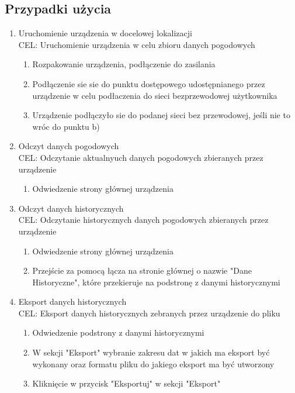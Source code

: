 \documentclass[12pt,a4paper]{article}
\begin{document}
\subsection{Przypadki użycia}

\begin{enumerate}
    \item Uruchomienie urządzenia w docelowej lokalizacji\\
    CEL: Uruchomienie urządzenia w celu zbioru danych pogodowych
    \begin{enumerate}
        \item Rozpakowanie urządzenia, podłączenie do zasilania
        \item Podłączenie sie sie do punktu dostępowego udostępnianego przez urządzenie w celu podłaczenia do sieci bezprzewodowej użytkownika
        \item Urządzenie podłączyło sie do podanej sieci bez przewodowej, jeśli nie to wróc do punktu b)
    \end{enumerate}
    \item Odczyt danych pogodowych\\
    CEL: Odczytanie aktualnyuch danych pogodowych zbieranych przez urządzenie
    \begin{enumerate}
        \item Odwiedzenie strony głównej urządzenia
    \end{enumerate}
    \item Odczyt danych historycznych\\
    CEL: Odczytanie historycznych danych pogodowych zbieranych przez urządzenie
    \begin{enumerate}
        \item Odwiedzenie strony głównej urządzenia
        \item Przejście za pomocą łącza na stronie głównej o nazwie "Dane Historyczne", które przekieruje na podstronę z danymi historycznymi
    \end{enumerate}
    \item Eksport danych historycznych\\
    CEL: Eksport danych historycznych zebranych przez urządzenie do pliku
    \begin{enumerate}
        \item Odwiedzenie podstrony z danymi historycznymi
        \item W sekcji "Eksport" wybranie zakresu dat w jakich ma eksport być wykonany oraz formatu pliku do jakiego eksport ma być utworzony
        \item Kliknięcie w przycisk "Eksportuj" w sekcji "Eksport"

\end{enumerate}
\end{enumerate}
\end{document}
